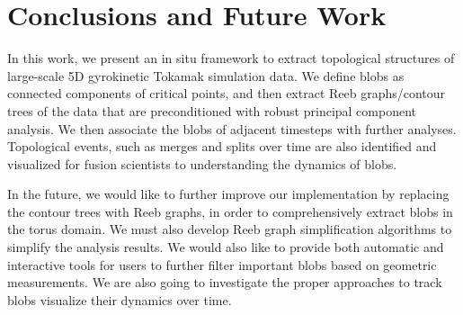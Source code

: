 \section{Conclusions and Future Work}
\label{sec:conclusions}

In this work, we present an in situ framework to extract topological structures of large-scale 5D gyrokinetic Tokamak simulation data.  We define blobs as connected components of critical points, and then extract Reeb graphs/contour trees of the data that are preconditioned with robust principal component analysis.  We then associate the blobs of adjacent timesteps with further analyses.  Topological events, such as merges and splits over time are also identified and visualized for fusion scientists to understanding the dynamics of blobs.  

In the future, we would like to further improve our implementation by replacing the contour trees with Reeb graphs, in order to comprehensively extract blobs in the torus domain.  We must also develop Reeb graph simplification algorithms to simplify the analysis results.  We would also like to provide both automatic and interactive tools for users to further filter important blobs based on geometric measurements.  
We are also going to investigate the proper approaches to track blobs visualize their dynamics over time.  

\iffalse
Guidelines for selecting persistence threshold.  Learning.  
Tracking over time.
Event visualization.  
In situ integration with ADIOS. 
Further collaboration with fusion scientists.  
\fi